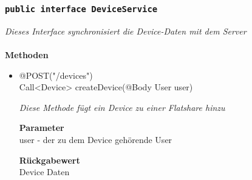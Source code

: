 	\subsubsection{\texttt{public interface DeviceService }}
\textit{Dieses Interface synchronisiert die Device-Daten mit dem Server}\\
\\
	\textbf{Methoden} \\
		\begin{itemize}
		\item{@POST("/devices") \\ Call<Device> createDevice(@Body User user)}

		\textit{Diese Methode fügt ein Device zu einer Flatshare hinzu}

		\textbf{Parameter} \\
	 user - der zu dem Device gehörende User 

		\textbf{Rückgabewert} \\
		Device Daten

	 \end{itemize}